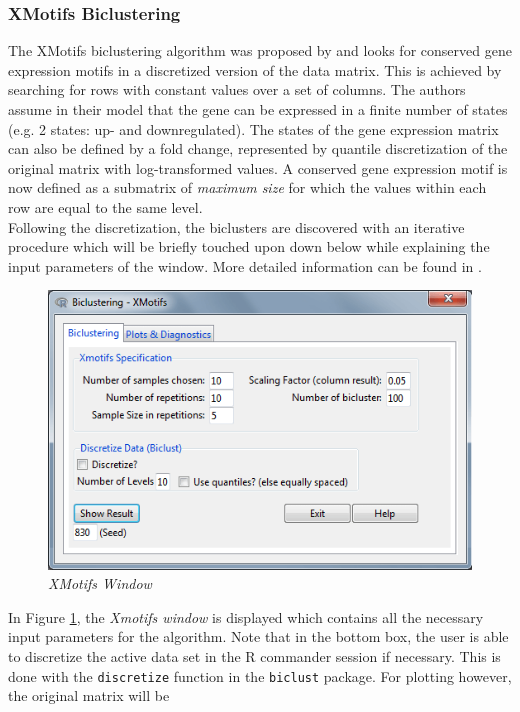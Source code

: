 \documentclass[a4paper]{article}\usepackage[]{graphicx}\usepackage[]{color}
\begin{document}
\subsubsection{XMotifs Biclustering}
The XMotifs biclustering algorithm was proposed by \citet{Murali2003} and
looks for conserved gene expression motifs in a discretized version of the data
matrix. This is achieved by searching for rows with constant values over a set
of columns. The authors assume in their model that the gene can be expressed in
a finite number of states (e.g. 2 states: up- and downregulated). The states of
the gene expression matrix can also be defined by a fold change, represented by
quantile discretization of the original matrix with log-transformed values. A
conserved gene expression motif is now defined as a submatrix of {\it maximum
size} for which the values within each row are equal to the same level. \\
Following the discretization, the biclusters are discovered with an iterative
procedure which will be briefly touched upon down below while explaining the
input parameters of the window. More detailed information can be
found in \citet{Murali2003}.
\begin{figure}[H]
\centering
\includegraphics[scale=0.5]{figures/xmotif_clusttab.png}
\caption{{\it XMotifs Window}\label{xmotif_clusttab}}
\end{figure}
\noindent In Figure \ref{xmotif_clusttab}, the {\it Xmotifs window} is displayed
which contains all the necessary input parameters for the algorithm. Note that
in the bottom box, the user is able to discretize the active data set in the R
commander session if necessary. This is done with the \verb|discretize| function
in the \verb|biclust| package. For plotting however, the original matrix will be
\end{document}
